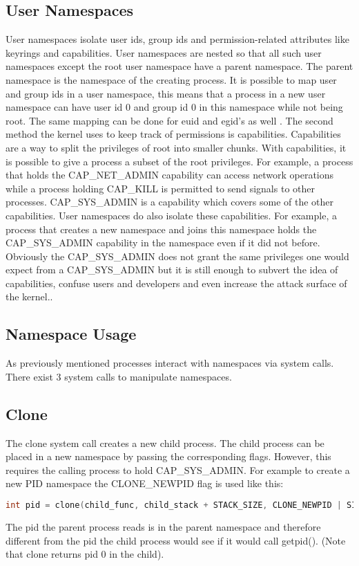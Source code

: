 \documentclass[10pt,twocolumn,a4paper]{article}
\begin{document}
\subsection{User Namespaces}
User namespaces isolate user ids, group ids and permission-related attributes like keyrings and
capabilities. User namespaces are nested so that all such user namespaces except the root user namespace
have a parent namespace. The parent namespace is the namespace of the creating process. 
It is possible to map user and group ids in a user namespace, this means that a process in a new user
namespace can have user id 0 and group id 0 in this namespace while not being root. The same mapping
can be done for euid and egid's as well \cite{18}. The second method the kernel uses to keep track
of permissions is capabilities. Capabilities are a way to split the privileges of root into smaller
chunks. With capabilities, it is possible to give a process a subset of the root
privileges. For example, a process that holds the CAP\_NET\_ADMIN capability can access network
operations while a process holding CAP\_KILL is permitted to send signals to other
processes\cite{19}. CAP\_SYS\_ADMIN is a capability which covers some of the
other capabilities. 
User namespaces do also isolate these capabilities. For example, a process that creates a new
namespace and joins this namespace holds the CAP\_SYS\_ADMIN capability in the namespace even if it did not before. Obviously the CAP\_SYS\_ADMIN does not grant the same privileges one would expect from
a  CAP\_SYS\_ADMIN but it is still enough to subvert the idea of capabilities, confuse users and
developers and even increase the attack surface of the kernel.\cite{20}. 

\subsection{Namespace Usage}
As previously mentioned processes interact with namespaces via system calls. There exist 3 system calls
to manipulate namespaces. 
\subsection{ Clone}
The clone system call creates a new child process. The child process can be placed in a new
namespace by passing the corresponding flags. However, this requires the calling process to hold
CAP\_SYS\_ADMIN. For example to create a new PID namespace the CLONE\_NEWPID flag is used like this:
\begin{lstlisting}[language=C]
    int pid = clone(child_func, child_stack + STACK_SIZE, CLONE_NEWPID | SIGCHLD, NULL);
\end{lstlisting}
The pid the parent process reads is in the parent namespace and therefore different from the pid the
child process would see if it would call getpid(). (Note that clone returns pid 0 in the
child)\cite{22}.
\end{document}
